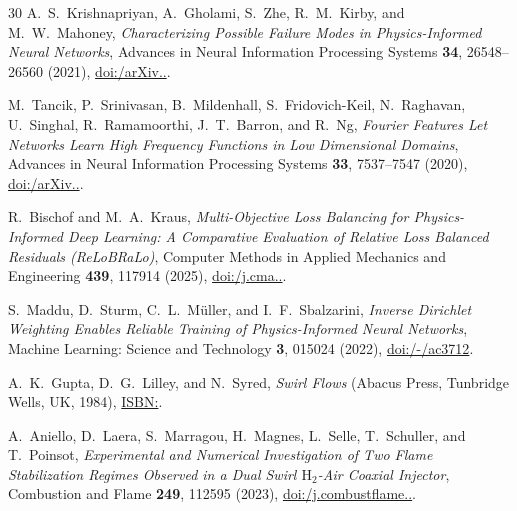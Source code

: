 \documentclass[reprint,aps,prfluids,superscriptaddress,twocolumn,floatfix]{revtex4-2}
\begin{document}
\begin{thebibliography}{30}
 A.~S.~Krishnapriyan, A.~Gholami, S.~Zhe, R.~M.~Kirby, and M.~W.~Mahoney, \textit{Characterizing Possible Failure Modes in Physics-Informed Neural Networks}, Advances in Neural Information Processing Systems \textbf{34}, 26548--26560 (2021), \href{https://doi.org/10.48550/arXiv.2109.01050}{doi:/\allowbreak arXiv..}.

 M.~Tancik, P.~Srinivasan, B.~Mildenhall, S.~Fridovich-Keil, N.~Raghavan, U.~Singhal, R.~Ramamoorthi, J.~T.~Barron, and R.~Ng, \textit{Fourier Features Let Networks Learn High Frequency Functions in Low Dimensional Domains}, Advances in Neural Information Processing Systems \textbf{33}, 7537--7547 (2020), \href{https://doi.org/10.48550/arXiv.2006.10739}{doi:/\allowbreak arXiv..}.

 R.~Bischof and M.~A.~Kraus, \textit{Multi-Objective Loss Balancing for Physics-Informed Deep Learning: A Comparative Evaluation of Relative Loss Balanced Residuals (ReLoBRaLo)}, Computer Methods in Applied Mechanics and Engineering \textbf{439}, 117914 (2025), \href{https://doi.org/10.1016/j.cma.2025.117914}{doi:/\allowbreak j.\allowbreak cma..}.

 S.~Maddu, D.~Sturm, C.~L.~M{\"u}ller, and I.~F.~Sbalzarini, \textit{Inverse Dirichlet Weighting Enables Reliable Training of Physics-Informed Neural Networks}, Machine Learning: Science and Technology \textbf{3}, 015024 (2022), \href{https://doi.org/10.1088/2632-2153/ac3712}{doi:/-/ac3712}.

 A.~K.~Gupta, D.~G.~Lilley, and N.~Syred, \textit{Swirl Flows} (Abacus Press, Tunbridge Wells, UK, 1984), \href{https://books.google.com/books?vid=ISBN9780856261756}{ISBN:}.

 A.~Aniello, D.~Laera, S.~Marragou, H.~Magnes, L.~Selle, T.~Schuller, and T.~Poinsot, \textit{Experimental and Numerical Investigation of Two Flame Stabilization Regimes Observed in a Dual Swirl $\mathrm{H}_2$-Air Coaxial Injector}, Combustion and Flame \textbf{249}, 112595 (2023), \href{https://doi.org/10.1016/j.combustflame.2022.112595}{doi:/\allowbreak j.\allowbreak combustflame..}.


\end{thebibliography}
\end{document}
